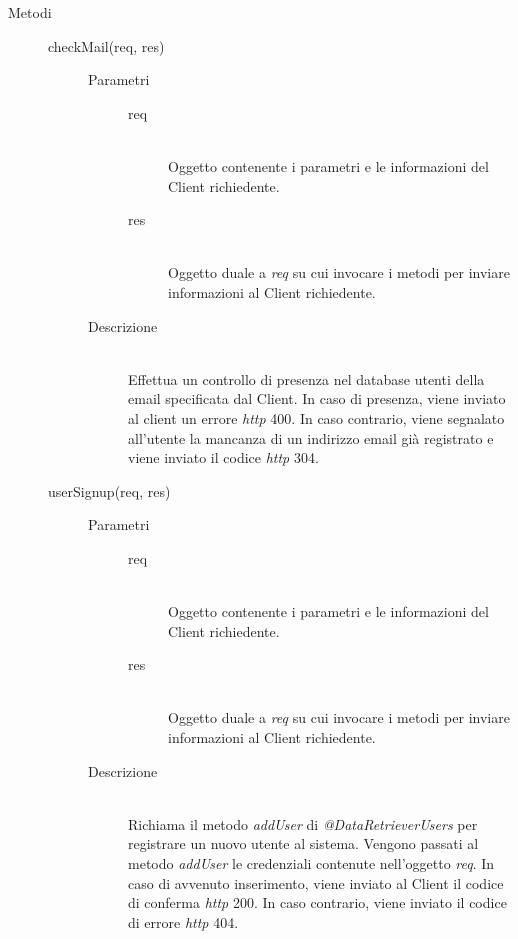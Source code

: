 \begin{description}
 \item[Metodi] \hfill
  \begin{description}
    \item[checkMail(req, res)] \hfill 
      \begin{description}
	   \item[Parametri] \hfill
	  \begin{description}
	    \item[req] \hfill \\
	    Oggetto contenente i parametri e le informazioni del Client richiedente.
	    \item[res] \hfill \\
	    Oggetto duale a \textit{req} su cui invocare i metodi per inviare informazioni al Client richiedente.
	  \end{description}
	\item[Descrizione] \hfill \\
	Effettua un controllo di presenza nel database utenti della email specificata dal Client. In caso di presenza, viene inviato al client un errore \textit{http} 400. In caso contrario, viene segnalato all'utente la mancanza 	di un indirizzo email già registrato e viene inviato il codice \textit{http} 304.
      \end{description}
    \item[userSignup(req, res)] \hfill
      \begin{description}
	\item[Parametri] \hfill
	  \begin{description}
	    \item[req] \hfill \\
	    Oggetto contenente i parametri e le informazioni del Client richiedente.
	    \item[res] \hfill \\
	    Oggetto duale a \textit{req} su cui invocare i metodi per inviare informazioni al Client richiedente.
	  \end{description}
	\item[Descrizione] \hfill \\
	Richiama il metodo \textit{addUser} di \textit{@DataRetrieverUsers} per registrare un nuovo utente al sistema. Vengono passati al metodo \textit{addUser} le credenziali contenute nell'oggetto \textit{req}. In caso di avvenuto inserimento, viene inviato al Client il codice di conferma \textit{http} 200. In caso contrario, viene inviato il 	codice di errore \textit{http} 404.
      \end{description}
    

\end{description}
\end{description}
